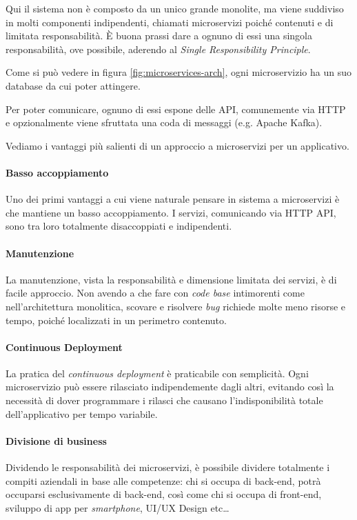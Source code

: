 Qui il sistema non è composto da un unico grande monolite, ma viene suddiviso in molti componenti indipendenti, chiamati microservizi poiché contenuti e di limitata responsabilità.
È buona prassi dare a ognuno di essi una singola responsabilità, ove possibile, aderendo al \textit{Single Responsibility Principle}.

Come si può vedere in figura \ref{fig:microservices-arch}, ogni microservizio ha un suo database da cui poter attingere.

Per poter comunicare, ognuno di essi espone delle API, comunemente via HTTP e opzionalmente viene sfruttata una coda di messaggi (e.g. Apache Kafka).

\medskip

Vediamo i vantaggi più salienti di un approccio a microservizi per un applicativo.

\paragraph*{Basso accoppiamento} Uno dei primi vantaggi a cui viene naturale pensare in sistema a microservizi è che mantiene un basso accoppiamento. I servizi, comunicando via HTTP API, sono tra loro totalmente disaccoppiati e indipendenti.

\paragraph*{Manutenzione} La manutenzione, vista la responsabilità e dimensione limitata dei servizi, è di facile approccio.
Non avendo a che fare con \textit{code base} intimorenti come nell'architettura monolitica, scovare e risolvere \textit{bug} richiede
molte meno risorse e tempo, poiché localizzati in un perimetro contenuto.

\paragraph*{Continuous Deployment} La pratica del \textit{continuous deployment} è praticabile con semplicità.
Ogni microservizio può essere rilasciato indipendemente dagli altri,
evitando così la necessità di dover programmare i rilasci che causano l'indisponibilità totale
dell'applicativo per tempo variabile.

\paragraph*{Divisione di business} Dividendo le responsabilità dei microservizi, è possibile dividere totalmente i compiti aziendali in base alle
competenze: chi si occupa di back-end, potrà occuparsi esclusivamente di
back-end, così come chi si occupa di front-end, sviluppo di app per \textit{smartphone}, UI/UX Design etc\dots

